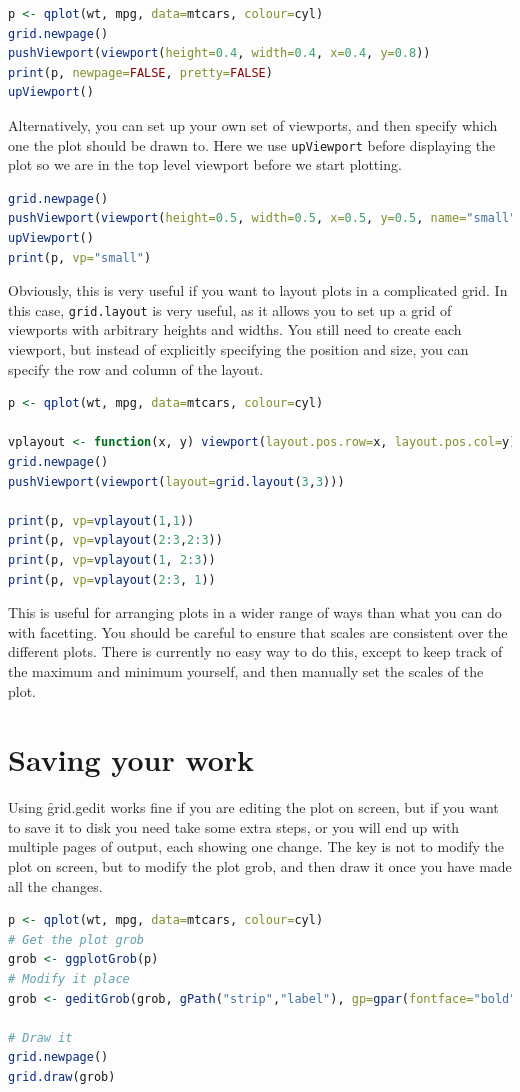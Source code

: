 \begin{lstlisting}[language = R]
p <- qplot(wt, mpg, data=mtcars, colour=cyl)
grid.newpage()
pushViewport(viewport(height=0.4, width=0.4, x=0.4, y=0.8))
print(p, newpage=FALSE, pretty=FALSE)
upViewport()
\end{lstlisting}

Alternatively, you can set up your own set of viewports, and then specify which one the plot should be drawn to.  Here we use {\tt upViewport} before displaying the plot so we are in the top level viewport before we start plotting.

\begin{lstlisting}[language = R]
grid.newpage()
pushViewport(viewport(height=0.5, width=0.5, x=0.5, y=0.5, name="small", angle=40))
upViewport()
print(p, vp="small")
\end{lstlisting}

Obviously, this is very useful if you want to layout plots in a complicated grid.  In this case, {\tt grid.layout} is very useful, as it allows you to set up a grid of viewports with arbitrary heights and widths.  You still need to create each viewport, but instead of explicitly specifying the position and size, you can specify the row and column of the layout.

\begin{lstlisting}[language = R]
p <- qplot(wt, mpg, data=mtcars, colour=cyl)

vplayout <- function(x, y) viewport(layout.pos.row=x, layout.pos.col=y)
grid.newpage()
pushViewport(viewport(layout=grid.layout(3,3)))

print(p, vp=vplayout(1,1))
print(p, vp=vplayout(2:3,2:3))
print(p, vp=vplayout(1, 2:3))
print(p, vp=vplayout(2:3, 1))
\end{lstlisting}

This is useful for arranging plots in a wider range of ways than what you can do with facetting.   You should be careful to ensure that scales are consistent over the different plots.  There is currently no easy way to do this, except to keep track of the maximum and minimum yourself, and then manually set the scales of the plot.

\section{Saving your work} 
\label{sec:grid-save}

Using \f{grid.gedit} works fine if you are editing the plot on screen, but if you want to save it to disk you need take some extra steps, or you will end up with multiple pages of output, each showing one change.  The key is not to modify the plot on screen, but to modify the plot grob, and then draw it once you have made all the changes.  

\begin{lstlisting}[language = R]
p <- qplot(wt, mpg, data=mtcars, colour=cyl)
# Get the plot grob
grob <- ggplotGrob(p)
# Modify it place
grob <- geditGrob(grob, gPath("strip","label"), gp=gpar(fontface="bold"))

# Draw it
grid.newpage()
grid.draw(grob)
\end{lstlisting}


